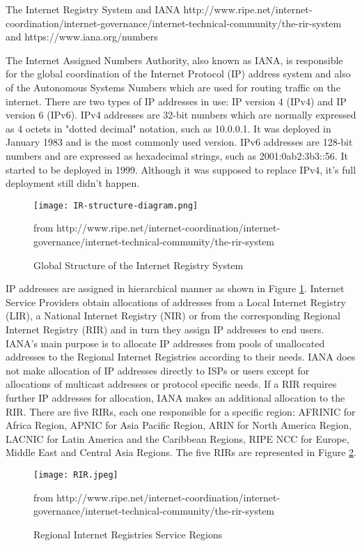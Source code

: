 \documentclass[11pt,a4paper]{scrreprt}
\begin{document}
The Internet Registry System and IANA http://www.ripe.net/internet-coordination/internet-governance/internet-technical-community/the-rir-system and https://www.iana.org/numbers

The Internet Assigned Numbers Authority, also known as IANA, is responsible for the global coordination of the Internet Protocol (IP) address system and also of the Autonomous Systems Numbers which are used for routing traffic on the internet. There are two types of IP addresses in use: IP version 4 (IPv4) and IP version 6 (IPv6). IPv4 addresses are 32-bit numbers which are normally expressed as 4 octets in "dotted decimal" notation, such as 10.0.0.1. It was deployed in January 1983 and is the most commonly used version. IPv6 addresses are 128-bit numbers and are expressed as hexadecimal strings, such as 2001:0ab2:3b3::56. It started to be deployed in 1999. Although it was supposed to replace IPv4, it's full deployment still didn't happen. 

\begin{figure}[h!]
\centering
\texttt{[image: IR-structure-diagram.png]}
\caption{Global Structure of the Internet Registry System}
from http://www.ripe.net/internet-coordination/internet-governance/internet-technical-community/the-rir-system
\label{fig:ir_structure_diagram}
\end{figure}

IP addresses are assigned in hierarchical manner as shown in Figure \ref{fig:ir_structure_diagram}. Internet Service Providers obtain allocations of addresses from a Local Internet Registry (LIR), a National Internet Registry (NIR) or from the corresponding Regional Internet Registry (RIR) and in turn they assign IP addresses to end users. IANA's main purpose is to allocate IP addresses from pools of unallocated addresses to the Regional Internet Registries according to their needs. IANA does not make allocation of IP addresses directly to ISPs or users except for allocations of multicast addresses or protocol specific needs. If a RIR requires further IP addresses for allocation, IANA makes an additional allocation to the RIR. There are five RIRs, each one responsible for a specific region: AFRINIC for Africa Region, APNIC for Asia Pacific Region, ARIN for North America Region, LACNIC for Latin America and the Caribbean Regions, RIPE NCC for Europe, Middle East and Central Asia Regions. The five RIRs are represented in Figure \ref{fig:rirs_image}.

\begin{figure}[h!]
\centering
\texttt{[image: RIR.jpeg]}
\caption{Regional Internet Registries Service Regions}
from http://www.ripe.net/internet-coordination/internet-governance/internet-technical-community/the-rir-system
\label{fig:rirs_image}
\end{figure}
\end{document}
